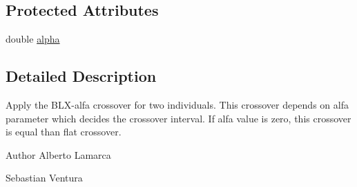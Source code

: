 \subsection*{Protected Attributes}
\begin{DoxyCompactItemize}
\item 
double \hyperlink{classnet_1_1sf_1_1jclec_1_1realarray_1_1rec_1_1_b_l_x_alpha_crossover_a2eae05311a51136efa625d718bcb33b4}{alpha}
\end{DoxyCompactItemize}


\subsection{Detailed Description}
Apply the B\-L\-X-\/alfa crossover for two individuals. This crossover depends on alfa parameter which decides the crossover interval. If alfa value is zero, this crossover is equal than flat crossover.

\begin{DoxyAuthor}{Author}
Alberto Lamarca 

Sebastian Ventura 
\end{DoxyAuthor}


